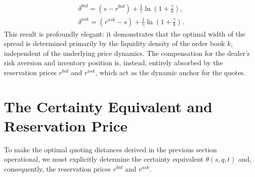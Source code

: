 \documentclass[a4paper,10pt,titlepage,oneside,openany]{book}
\theoremstyle{plain}\newtheorem{theorem}{Theorem}[chapter]
\theoremstyle{definition}\newtheorem{definition}{Definition}[chapter]
\theoremstyle{remark}\newtheorem{remark}{Remark}[chapter]
\begin{document}
\begin{align*}
    &\delta^{bid} = (s - r^{bid}) + \frac{1}{\gamma} \ln \left( 1 + \frac{\gamma}{k} \right),\\
    &\delta^{ask} = (r^{ask} - s) + \frac{1}{\gamma} \ln \left( 1 + \frac{\gamma}{k} \right).
\end{align*}
This result is profoundly elegant: it demonstrates that the optimal width of the spread is determined primarily by the liquidity density of the order book $k$, independent of the underlying price dynamics. The compensation for the dealer's risk aversion and inventory position is, instead, entirely absorbed by the reservation prices $r^{bid}$ and $r^{ask}$, which act as the dynamic anchor for the quotes.

\section{The Certainty Equivalent and Reservation Price}
To make the optimal quoting distances derived in the previous section operational, we must explicitly determine the certainty equivalent $\theta(s,q,t)$ and, consequently, the reservation prices $r^{bid}$ and $r^{ask}$. 
\end{document}
